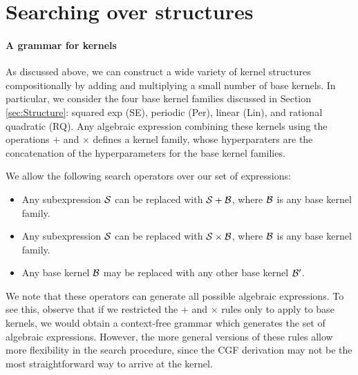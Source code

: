 \documentclass[twoside]{article}
\begin{document}
%

\section{Searching over structures}

\paragraph{A grammar for kernels}

As discussed above, we can construct a wide variety of kernel structures compositionally by adding and multiplying a small number of base kernels. In particular, we consider the four base kernel families discussed in Section \ref{sec:Structure}: squared exp (SE), periodic (Per), linear (Lin), and rational quadratic (RQ). Any algebraic expression combining these kernels using the operations $+$ and $\times$ defines a kernel family, whose hyperparaters are the concatenation of the hyperparameters for the base kernel families. 

We allow the following search operators over our set of expressions:
\begin{itemize}
\item Any subexpression ${\cal S}$ can be replaced with ${\cal S} + {\cal B}$, where ${\cal B}$ is any base kernel family.
\item Any subexpression ${\cal S}$ can be replaced with ${\cal S} \times {\cal B}$, where ${\cal B}$ is any base kernel family.
\item Any base kernel ${\cal B}$ may be replaced with any other base kernel ${\cal B}^\prime$.
\end{itemize}

We note that these operators can generate all possible algebraic expressions. To see this, observe that if we restricted the $+$ and $\times$ rules only to apply to base kernels, we would obtain a context-free grammar which generates the set of algebraic expressions. However, the more general versions of these rules allow more flexibility in the search procedure, since the CGF derivation may not be the most straightforward way to arrive at the kernel.




\end{document}
